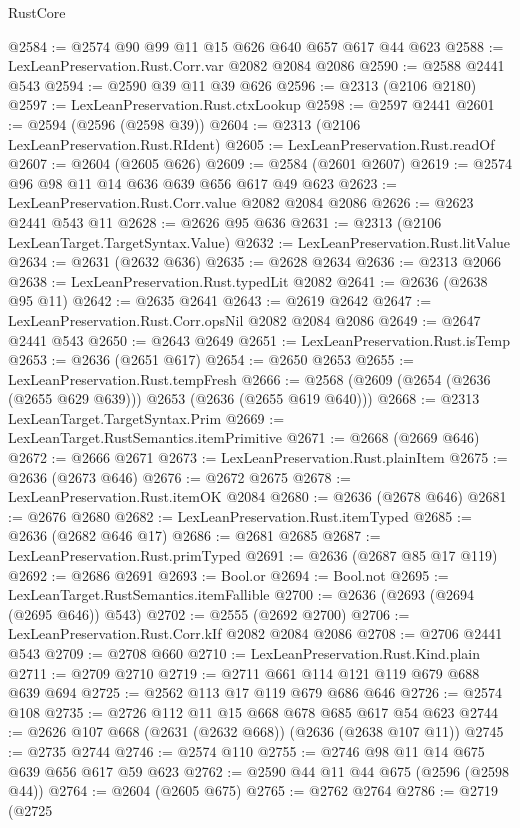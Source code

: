 \begin{lexlean}{RustCore}
\begin{coremodule}
@2584 := @2574 @90 @99 @11 @15 @626 @640 @657 @617 @44 @623
@2588 := LexLeanPreservation.Rust.Corr.var @2082 @2084 @2086
@2590 := @2588 @2441 @543
@2594 := @2590 @39 @11 @39 @626
@2596 := @2313 (@2106 @2180)
@2597 := LexLeanPreservation.Rust.ctxLookup
@2598 := @2597 @2441
@2601 := @2594 (@2596 (@2598 @39))
@2604 := @2313 (@2106 LexLeanPreservation.Rust.RIdent)
@2605 := LexLeanPreservation.Rust.readOf
@2607 := @2604 (@2605 @626)
@2609 := @2584 (@2601 @2607)
@2619 := @2574 @96 @98 @11 @14 @636 @639 @656 @617 @49 @623
@2623 := LexLeanPreservation.Rust.Corr.value @2082 @2084 @2086
@2626 := @2623 @2441 @543 @11
@2628 := @2626 @95 @636
@2631 := @2313 (@2106 LexLeanTarget.TargetSyntax.Value)
@2632 := LexLeanPreservation.Rust.litValue
@2634 := @2631 (@2632 @636)
@2635 := @2628 @2634
@2636 := @2313 @2066
@2638 := LexLeanPreservation.Rust.typedLit @2082
@2641 := @2636 (@2638 @95 @11)
@2642 := @2635 @2641
@2643 := @2619 @2642
@2647 := LexLeanPreservation.Rust.Corr.opsNil @2082 @2084 @2086
@2649 := @2647 @2441 @543
@2650 := @2643 @2649
@2651 := LexLeanPreservation.Rust.isTemp
@2653 := @2636 (@2651 @617)
@2654 := @2650 @2653
@2655 := LexLeanPreservation.Rust.tempFresh
@2666 := @2568 (@2609 (@2654 (@2636 (@2655 @629 @639))) @2653 (@2636 (@2655 @619 @640)))
@2668 := @2313 LexLeanTarget.TargetSyntax.Prim
@2669 := LexLeanTarget.RustSemantics.itemPrimitive
@2671 := @2668 (@2669 @646)
@2672 := @2666 @2671
@2673 := LexLeanPreservation.Rust.plainItem
@2675 := @2636 (@2673 @646)
@2676 := @2672 @2675
@2678 := LexLeanPreservation.Rust.itemOK @2084
@2680 := @2636 (@2678 @646)
@2681 := @2676 @2680
@2682 := LexLeanPreservation.Rust.itemTyped
@2685 := @2636 (@2682 @646 @17)
@2686 := @2681 @2685
@2687 := LexLeanPreservation.Rust.primTyped
@2691 := @2636 (@2687 @85 @17 @119)
@2692 := @2686 @2691
@2693 := Bool.or
@2694 := Bool.not
@2695 := LexLeanTarget.RustSemantics.itemFallible
@2700 := @2636 (@2693 (@2694 (@2695 @646)) @543)
@2702 := @2555 (@2692 @2700)
@2706 := LexLeanPreservation.Rust.Corr.kIf @2082 @2084 @2086
@2708 := @2706 @2441 @543
@2709 := @2708 @660
@2710 := LexLeanPreservation.Rust.Kind.plain
@2711 := @2709 @2710
@2719 := @2711 @661 @114 @121 @119 @679 @688 @639 @694
@2725 := @2562 @113 @17 @119 @679 @686 @646
@2726 := @2574 @108
@2735 := @2726 @112 @11 @15 @668 @678 @685 @617 @54 @623
@2744 := @2626 @107 @668 (@2631 (@2632 @668)) (@2636 (@2638 @107 @11))
@2745 := @2735 @2744
@2746 := @2574 @110
@2755 := @2746 @98 @11 @14 @675 @639 @656 @617 @59 @623
@2762 := @2590 @44 @11 @44 @675 (@2596 (@2598 @44))
@2764 := @2604 (@2605 @675)
@2765 := @2762 @2764
@2786 := @2719
    (@2725

\end{coremodule}
\end{lexlean}
